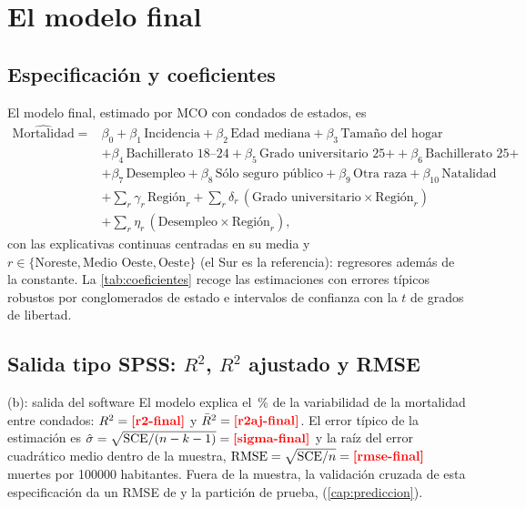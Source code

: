 \chapter{El modelo final}\label{cap:modelo-final}

\section{Especificación y coeficientes}

El modelo final, estimado por MCO con  condados de  estados, es
\[
\begin{aligned}
\widehat{\text{Mortalidad}} ={}& \beta_0
 + \beta_1\,\text{Incidencia} + \beta_2\,\text{Edad mediana}
 + \beta_3\,\text{Tamaño del hogar}\\
&+ \beta_4\,\text{Bachillerato 18--24} + \beta_5\,\text{Grado universitario 25+}
 + \beta_6\,\text{Bachillerato 25+}\\
&+ \beta_7\,\text{Desempleo} + \beta_8\,\text{Sólo seguro público}
 + \beta_9\,\text{Otra raza} + \beta_{10}\,\text{Natalidad}\\
&+ \textstyle\sum_{r}\gamma_r\,\text{Región}_r
 + \sum_{r}\delta_r\,(\text{Grado universitario}\times\text{Región}_r)\\
&+ \textstyle\sum_{r}\eta_r\,(\text{Desempleo}\times\text{Región}_r),
\end{aligned}
\]
con las explicativas continuas centradas en su media y $r\in\{\text{Noreste},\text{Medio Oeste},
\text{Oeste}\}$ (el Sur es la referencia):  regresores además de la constante. La
\cref{tab:coeficientes} recoge las estimaciones con errores típicos robustos por conglomerados de
estado e intervalos de confianza con la $t$ de  grados de libertad.



\section{Salida tipo SPSS: \texorpdfstring{$R^2$}{R²}, \texorpdfstring{$R^2$}{R²} ajustado y RMSE}\label{sec:salida-spss}

\begin{entregable}{(b): salida del software}
El modelo explica el \,\% de la variabilidad de la mortalidad entre condados:
$R^2=\res{r2-final}$ y $\bar R^2=\res{r2aj-final}$. El error típico de la estimación es
$\hat\sigma=\sqrt{\mathrm{SCE}/(n-k-1)}=\res{sigma-final}$ y la raíz del error cuadrático medio
dentro de la muestra, $\mathrm{RMSE}=\sqrt{\mathrm{SCE}/n}=\res{rmse-final}$ muertes por
\num{100000} habitantes. Fuera de la muestra, la validación cruzada de esta especificación da un
RMSE de  y la partición de prueba, 
(\cref{cap:prediccion}).
\end{entregable}

